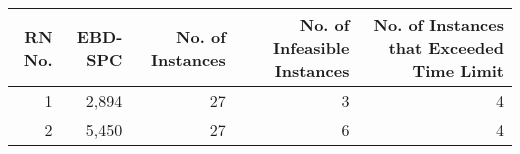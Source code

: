 \begin{tabular}{rrrrr}
\toprule
 RN No. & EBD-SPC &  No. of Instances &  No. of Infeasible Instances &  No. of Instances that Exceeded Time Limit \\
\midrule
      1 &   2,894 &                27 &                            3 &                                          4 \\
      2 &   5,450 &                27 &                            6 &                                          4 \\
\bottomrule
\end{tabular}
